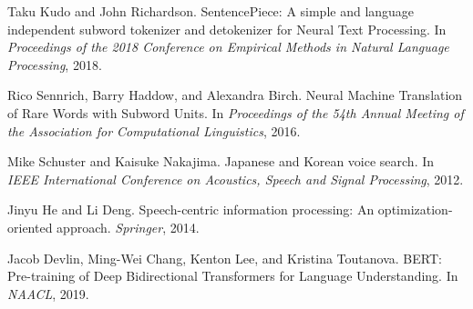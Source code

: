 \documentclass[twoside,11pt]{article}
\begin{document}
\begin{thebibliography}{}

Taku Kudo and John Richardson.
\newblock SentencePiece: A simple and language independent subword tokenizer and detokenizer for Neural Text Processing.
\newblock In \emph{Proceedings of the 2018 Conference on Empirical Methods in Natural Language Processing}, 2018.

Rico Sennrich, Barry Haddow, and Alexandra Birch.
\newblock Neural Machine Translation of Rare Words with Subword Units.
\newblock In \emph{Proceedings of the 54th Annual Meeting of the Association for Computational Linguistics}, 2016.

Mike Schuster and Kaisuke Nakajima.
\newblock Japanese and Korean voice search.
\newblock In \emph{IEEE International Conference on Acoustics, Speech and Signal Processing}, 2012.

Jinyu He and Li Deng.
\newblock Speech-centric information processing: An optimization-oriented approach.
\newblock \emph{Springer}, 2014.

Jacob Devlin, Ming-Wei Chang, Kenton Lee, and Kristina Toutanova.
\newblock BERT: Pre-training of Deep Bidirectional Transformers for Language Understanding.
\newblock In \emph{NAACL}, 2019.

\end{thebibliography}
\end{document}

